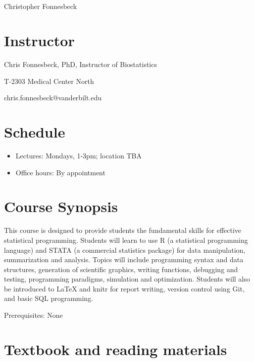 \documentclass[11pt,oneside]{article}
\title{\mytitle \\ \mysubtitle}
\author{\myauthor}
\def\myauthor{Christopher Fonnesbeck}
\def\mycopyright{\myauthor}
\begin{document}

\maketitle

\textcopyright{} \mycopyright

%
%


\setlength{\parindent}{1em}


\section{Instructor}
\label{instructor}

Chris Fonnesbeck, PhD, Instructor of Biostatistics

T-2303 Medical Center North

chris.fonnesbeck@vanderbilt.edu

\section{Schedule}
\label{schedule}

\begin{itemize}

\item Lectures: Mondays, 1-3pm; location TBA
\item Office hours: By appointment
\end{itemize}

\section{Course Synopsis}
\label{coursesynopsis}

This course is designed to provide students the fundamental skills for effective statistical programming. Students will learn to use R (a statistical programming language) and STATA (a commercial statistics package) for data manipulation, summarization and analysis. Topics will include programming syntax and data structures, generation of scientific graphics, writing functions, debugging and testing, programming paradigms, simulation and optimization. Students will also be introduced to LaTeX and knitr for report writing, version control using Git, and basic SQL programming.

Prerequisites: None

\section{Textbook and reading materials}
\label{textbookandreadingmaterials}
\end{document}
